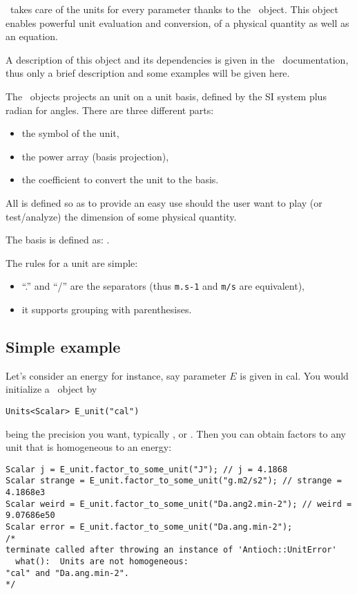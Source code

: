 \Antioch\ takes care of the units for every
parameter thanks to the \Units\ object. This object
enables powerful unit evaluation and conversion,
of a physical quantity as well as an equation.

A description of this object and its dependencies is
given in the \Doxygen\ documentation, thus only a
brief description and some examples will be given here.

The \Units\ objects projects an unit on a unit basis,
defined by the SI system plus radian for angles. There are
three different parts:
\begin{itemize}
\item the symbol of the unit,
\item the power array (basis projection),
\item the coefficient to convert the unit to the basis.
\end{itemize}

All is defined so as to provide an easy use should the user
want to play (or test/analyze) the dimension of some physical
quantity.

The basis is defined as: \unitbase.

The rules for a unit are simple:
\begin{itemize}
\item ``.'' and ``/'' are the separators 
        (thus \verb!m.s-1! and \verb!m/s! are equivalent),
\item it supports grouping with parenthesises.
\end{itemize}

\subsection{Simple example}

Let's consider an energy for instance, say parameter
$E$ is given in \unit{cal}. You would initialize a \Units\
object by 
\begin{verbatim}
Units<Scalar> E_unit("cal")
\end{verbatim}
 being the precision you want, typically ,
\prog{double} or \prog{long double}. Then you can obtain factors
to any unit that is homogeneous to an energy:
\begin{verbatim}
Scalar j = E_unit.factor_to_some_unit("J"); // j = 4.1868
Scalar strange = E_unit.factor_to_some_unit("g.m2/s2"); // strange = 4.1868e3
Scalar weird = E_unit.factor_to_some_unit("Da.ang2.min-2"); // weird = 9.07686e50
Scalar error = E_unit.factor_to_some_unit("Da.ang.min-2"); 
/*
terminate called after throwing an instance of 'Antioch::UnitError'
  what():  Units are not homogeneous:
"cal" and "Da.ang.min-2".
*/ 
\end{verbatim}

